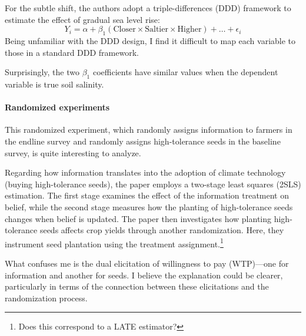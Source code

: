 \documentclass[12pt]{article}[margin=1in]
\begin{document}
For the subtle shift, the authors adopt a triple-differences (DDD) framework to estimate the effect of gradual sea level rise:
\begin{equation}
    Y_i = \alpha + \beta_1 (\text{Closer} \times \text{Saltier} \times \text{Higher}) + \ldots + \epsilon_i
\end{equation}
Being unfamiliar with the DDD design, I find it difficult to map each variable to those in a standard DDD framework.

Surprisingly, the two $\beta_1$ coefficients have similar values when the dependent variable is true soil salinity.


\paragraph{Randomized experiments} 
This randomized experiment, which randomly assigns information to farmers in the endline survey and randomly assigns high-tolerance seeds in the baseline survey, is quite interesting to analyze.

Regarding how information translates into the adoption of climate technology (buying high-tolerance seeds), the paper employs a two-stage least squares (2SLS) estimation. The first stage examines the effect of the information treatment on belief, while the second stage measures how the planting of high-tolerance seeds changes when belief is updated. The paper then investigates how planting high-tolerance seeds affects crop yields through another randomization. Here, they instrument seed plantation using the treatment assignment.\footnote{Does this correspond to a LATE estimator?}

What confuses me is the dual elicitation of willingness to pay (WTP)—one for information and another for seeds. I believe the explanation could be clearer, particularly in terms of the connection between these elicitations and the randomization process.

\pagebreak \newpage 
\end{document}
